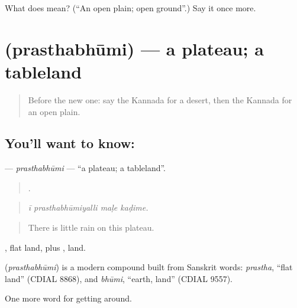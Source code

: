\begin{tcolorbox}[breakable,colback=teal!4,colframe=teal!35!black,title={Before you move on}]
What does  mean? (\textquotedblleft{}An open plain; open ground\textquotedblright{}.) Say it once more.
\end{tcolorbox}
\section[\texorpdfstring{\kn{ಪ್ರಸ್ಥಭೂಮಿ} (prasthabhūmi)}{ಪ್ರಸ್ಥಭೂಮಿ (prasthabhūmi)}]{ (prasthabhūmi) — a plateau; a tableland}

\label{lesson:KA-C480-prasthabhumi}



\begin{quote}
Before the new one: say the Kannada for a desert, then the Kannada for an open plain.
\end{quote}

\subsection*{You'll want to know: }
\textbf{} — \emph{prasthabhūmi} — \textquotedblleft{}a plateau; a tableland\textquotedblright{}.

\begin{quote}
   .
\end{quote}

\begin{quote}
\emph{ī prasthabhūmiyalli maḷe kaḍime.}
\end{quote}

\begin{quote}
There is little rain on this plateau.
\end{quote}

, flat land, plus , land.

\begin{cousinweb}
\textbf{} (\emph{prasthabhūmi}) is a modern compound built from Sanskrit words: \emph{prastha}, \textquotedblleft{}flat land\textquotedblright{} (CDIAL 8868), and \emph{bhūmi}, \textquotedblleft{}earth, land\textquotedblright{} (CDIAL 9557).
\end{cousinweb}

\begin{grammarlens}[title={What you've built}]
One more word for getting around.
\end{grammarlens}

